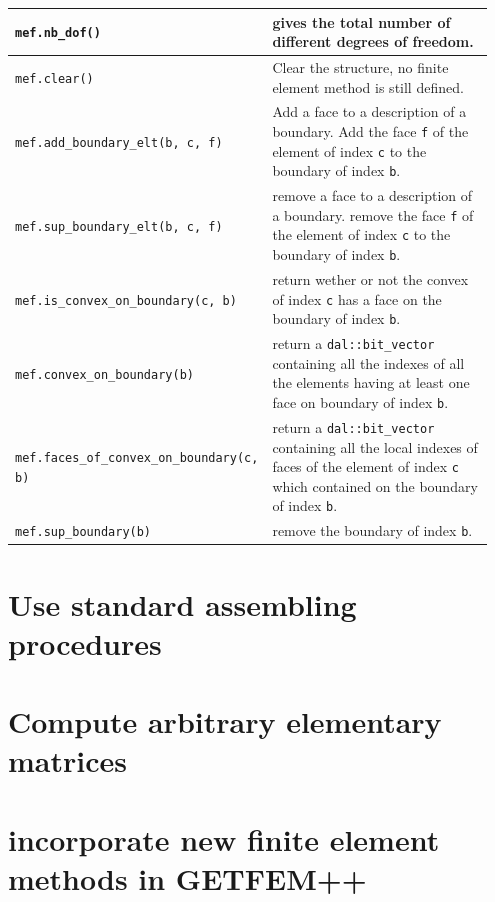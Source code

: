\documentclass[11pt,a4paper]{article}
\begin{document}
\begin{center}
\begin{tabular}{|m{0.4\linewidth}|m{0.55\linewidth}|}
  {\tt mef.nb\_dof()} & gives the total number of different degrees of freedom.  \\ \hline

  {\tt mef.clear()} & Clear the structure, no finite element method is still defined.  \\ \hline

  {\tt mef.add\_boundary\_elt(b, c, f)} & Add a face to a description of a boundary. Add the face {\tt f} of the element of index {\tt c} to the boundary of index {\tt b}.  \\ \hline
  
  {\tt mef.sup\_boundary\_elt(b, c, f)} & remove a face to a description of a boundary. remove the face {\tt f} of the element of index {\tt c} to the boundary of index {\tt b}.  \\ \hline
  
  {\tt mef.is\_convex\_on\_boundary(c, b)} & return wether or not the convex of index {\tt c}  has a face on the boundary of index {\tt b}.  \\ \hline
  
  {\tt mef.convex\_on\_boundary(b)} & return a {\tt dal::bit\_vector} containing all the indexes of all the elements having at least one face on boundary of index {\tt b}.  \\ \hline

  {\tt mef.faces\_of\_convex\_on\_boundary(c, b) } & return a {\tt dal::bit\_vector} containing all the local indexes of faces of the element of index {\tt c} which contained on the boundary of index {\tt b}.  \\ \hline

  {\tt mef.sup\_boundary(b) } & remove the boundary of index {\tt b}.  \\ \hline

\end{tabular} \end{center}


\section{Use standard assembling procedures}



\section{Compute arbitrary elementary matrices}

\section{incorporate new finite element methods in GETFEM++}
\end{document}
